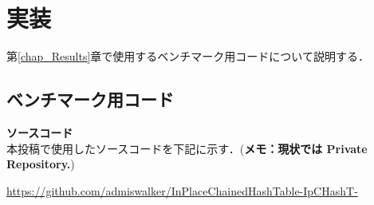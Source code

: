 \chapter{実装}
\label{chap_Implementation}

第\ref{chap_Results}章で使用するベンチマーク用コードについて説明する．

\section{ベンチマーク用コード}

{\bf ソースコード}
\samepage \\ \indent
本投稿で使用したソースコードを下記に示す．({\bf \color{red}メモ：現状では Private Repository.})
\begin{center}
  \url{https://github.com/admiswalker/InPlaceChainedHashTable-IpCHashT-}
\end{center}

